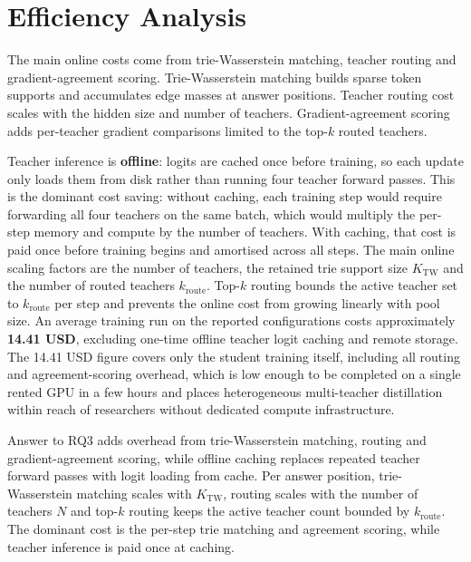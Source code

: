 \section{Efficiency Analysis}
\label{sec:efficiency-analysis}
The main online costs come from trie-Wasserstein matching, teacher routing and
gradient-agreement scoring. Trie-Wasserstein matching builds sparse token
supports and accumulates edge masses at answer positions. Teacher routing cost
scales with the hidden size and number of teachers. Gradient-agreement scoring
adds per-teacher gradient comparisons limited to the top-\(k\) routed teachers.

Teacher inference is \textbf{offline}: logits are cached once before training, so each
update only loads them from disk rather than running four teacher forward
passes. This is the dominant cost saving: without caching, each training
step would require forwarding all four teachers on the same batch, which
would multiply the per-step memory and compute by the number of teachers.
With caching, that cost is paid once before training begins and amortised
across all steps. The main online scaling factors are the number of teachers,
the retained trie support size \(K_{\mathrm{TW}}\) and the number of routed
teachers \(k_{\mathrm{route}}\). Top-\(k\) routing bounds the active teacher
set to \(k_{\mathrm{route}}\) per step and prevents the online cost from
growing linearly with pool size. An average training run on the reported
configurations costs approximately \textbf{14.41 USD}, excluding one-time
offline teacher logit caching and remote storage. The 14.41 USD figure covers
only the student training itself, including all routing and
agreement-scoring overhead, which is low enough to be completed on a single
rented GPU in a few hours and places heterogeneous multi-teacher distillation
within reach of researchers without dedicated compute infrastructure.

\begin{rqanswerbox}{Answer to RQ3}
\methodname{} adds overhead from trie-Wasserstein matching, routing and
gradient-agreement scoring, while offline caching replaces repeated teacher forward passes with logit
loading from cache. Per answer position,
trie-Wasserstein matching scales with \(K_{\mathrm{TW}}\), routing scales with
the number of teachers \(N\) and top-\(k\) routing keeps the active teacher
count bounded by \(k_{\mathrm{route}}\). The dominant cost is the per-step trie matching and agreement scoring, while teacher
inference is paid once at caching.
\end{rqanswerbox}

